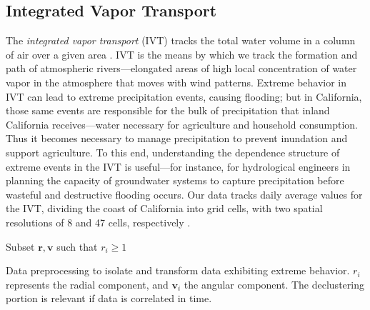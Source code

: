 \subsection{Integrated Vapor Transport\label{subsec:ivt}}
The \emph{integrated vapor transport} (IVT) tracks the total water volume in a column of air over a given
  area \citep{ralph2017}.  IVT is the means by which we track the formation and path of atmospheric 
  rivers---elongated areas of high local concentration of water vapor in the atmosphere that moves with
  wind patterns.  Extreme behavior in IVT can lead to extreme precipitation events, causing flooding; 
  but in California, those same events are responsible for the bulk of precipitation that inland 
  California receives---water necessary for agriculture and household consumption.  Thus it becomes 
  necessary to manage precipitation to prevent inundation and support agriculture.  To this end, 
  understanding the dependence structure of extreme events in the IVT is useful---for instance, for 
  hydrological engineers in planning the capacity of groundwater systems to capture precipitation before 
  wasteful and destructive flooding occurs.  Our data tracks daily average values for the IVT, dividing 
  the coast of California into grid cells, with two spatial resolutions of 8 and 47 cells, respectively 
  \citep{guan2015}.

\begin{algorithm}[h]
  Subset $\bm{ r},\bm{ v}$ such that $r_i \geq 1$\\
 \caption{Data preprocessing to isolate and transform data exhibiting extreme behavior.  $r_i$
   represents the radial component, and $\bm{v}_i$ the angular component.  The declustering
   portion is relevant if data is correlated in time.\label{algo:processing}}
\end{algorithm}

